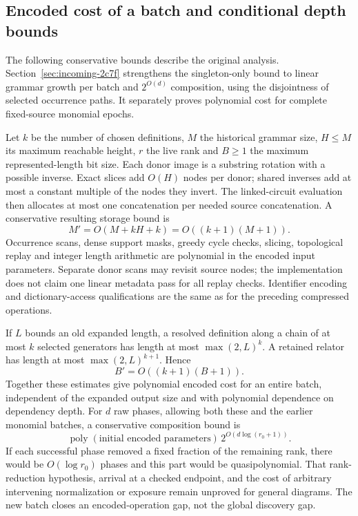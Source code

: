 \subsection{Encoded cost of a batch and conditional depth bounds}

The following conservative bounds describe the original analysis.
Section~\ref{sec:incoming-2c7f} strengthens the singleton-only bound to
linear grammar growth per batch and $2^{O(d)}$ composition, using the
disjointness of selected occurrence paths. It separately proves polynomial
cost for complete fixed-source monomial epochs.

Let $k$ be the number of chosen definitions, $M$ the historical grammar
size, $H\le M$ its maximum reachable height, $r$ the live rank and $B\ge1$
the maximum represented-length bit size. Each donor image is a substring
rotation with a possible inverse. Exact slices add $O(H)$ nodes per donor;
shared inverses add at most a constant multiple of the nodes they invert.
The linked-circuit evaluation then allocates at most one concatenation
per needed source concatenation. A conservative resulting storage bound is
\[
 M'=O(M+kH+k)=O((k+1)(M+1)).
\]
Occurrence scans, dense support masks, greedy cycle checks, slicing,
topological replay and integer length arithmetic are polynomial in the
encoded input parameters. Separate donor scans may revisit source nodes;
the implementation does not claim one linear metadata pass for all replay
checks. Identifier encoding and dictionary-access qualifications are the
same as for the preceding compressed operations.

If $L$ bounds an old expanded length, a resolved definition along a chain
of at most $k$ selected generators has length at most
$\max(2,L)^k$. A retained relator has length at most
$\max(2,L)^{k+1}$. Hence
\[
 B'=O((k+1)(B+1)).
\]
Together these estimates give polynomial encoded cost for an entire batch,
independent of the expanded output size and with polynomial dependence on
dependency depth. For $d$ raw phases, allowing both these and the earlier
monomial batches, a conservative composition bound is
\[
 \operatorname{poly}(\text{initial encoded parameters})\,
       2^{O(d\log(r_0+1))}.
\]
If each successful phase removed a fixed fraction of the remaining rank,
there would be $O(\log r_0)$ phases and this part would be quasipolynomial.
That rank-reduction hypothesis, arrival at a checked endpoint, and the
cost of arbitrary intervening normalization or exposure remain unproved
for general diagrams. The new batch closes an encoded-operation gap, not
the global discovery gap.

